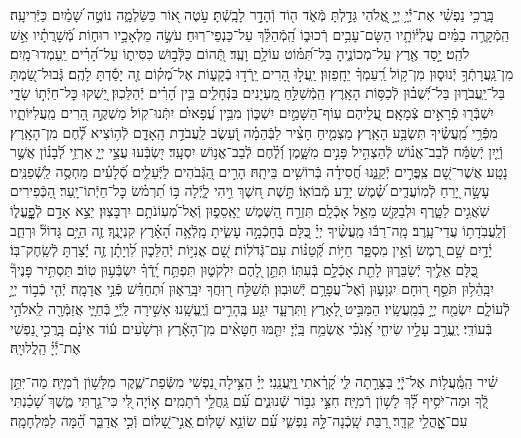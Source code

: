 \documentclass[twoside, openany, parskip=half, 11pt]{book}
\begin{document}
בָּֽרֲכִ֥י נַפְשִׁ֗י אֶת־יְֿ֫יָ֥ יְיָ֣ אֱ֭לֹהַי גָּדַ֣לְתָּ מְּֿאֹ֑ד ה֖וֹד וְֿהָדָ֣ר לָבָֽשְֿׁתָּ׃ עֹ֣טֶה א֭וֹר כַּשַּׂלְמָ֑ה נוֹטֶ֣ה שָׁ֝מַ֗יִם כַּיְּֿרִיעָֽה׃ הַֽמְֿקָרֶ֥ה בַמַּ֗יִם עֲלִיּ֫וֹתָ֥יו הַשָּׂם־עָבִ֥ים רְֿכוּב֑וֹ הַֽ֝מְֿהַלֵּ֗ךְ עַל־כַּנְפֵי־רֽוּחַ׃ עֹשֶׂ֣ה מַלְאָכָ֣יו רוּח֑וֹת מְֿ֝שָׁרֲתָ֗יו אֵ֣שׁ לֹהֵֽט׃ יָ֣סַד אֶ֖רֶץ עַל־מְכוֹנֶ֑יהָ בַּל־תִּ֝מּ֗וֹט עוֹלָ֥ם וָעֶֽד׃ תְּֿ֭הוֹם כַּלְּֿב֣וּשׁ כִּסִּית֑וֹ עַל־הָ֝רִ֗ים יַֽעַמְדוּ־מָֽיִם׃ מִן־גַּֽעֲרָתְֿךָ֥ יְֿנוּס֑וּן מִן־ק֥וֹל רַֽ֝עַמְךָ֗ יֵחָֽפֵזֽוּן׃ יַֽעֲל֣וּ הָ֭רִים יֵֽרְֿד֣וּ בְֿקָע֑וֹת אֶל־מְ֝ק֗וֹם זֶ֤ה יָסַ֬דְתָּ לָהֶֽם׃ גְּֽֿבוּל־שַׂ֭מְתָּ בַּל־יַֽעֲבֹר֑וּן בַּל־יְֿ֝שֻׁב֗וּן לְֿכַסּ֥וֹת הָאָֽרֶץ׃ הַֽמְֿשַׁלֵּ֣חַ מַ֭עְיָנִים בַּנְּֿחָלִ֑ים בֵּ֥ין הָ֝רִ֗ים יְֿהַלֵּכֽוּן׃ יַ֭שְׁקוּ כׇּל־חַיְֿת֣וֹ שָׂדָ֑י יִשְׁבְּֿר֖וּ פְֿרָאִ֣ים צְֿמָאָֽם׃ עֲ֭לֵיהֶם עֽוֹף־הַשָּׁמַ֣יִם יִשְׁכּ֑וֹן מִבֵּ֥ין עֳ֝פָאיִ֗ם יִתְּֿנוּ־קֽוֹל׃ מַשְׁקֶ֣ה הָ֭רִים מֵֽעֲלִיּוֹתָ֑יו מִפְּֿרִ֥י מַֽ֝עֲשֶׂ֗יךָ תִּשְׂבַּ֥ע הָאָֽרֶץ׃ מַצְמִ֤יחַ חָצִ֨יר לַבְּֿהֵמָ֗ה וְֿ֭עֵשֶׂב לַֽעֲבֹדַ֣ת הָֽאָדָ֑ם לְֿה֥וֹצִיא לֶ֝֗חֶם מִן־הָאָֽרֶץ׃ וְֿיַ֤יִן יְֿשַׂמַּ֬ח לְֽֿבַב־אֱנ֗וֹשׁ לְֿהַצְהִ֣יל פָּנִ֣ים מִשָּׁ֑מֶן וְֿ֝לֶ֗חֶם לְֿבַב־אֱנ֥וֹשׁ יִסְעָֽד׃ יִ֭שְׂבְּֿעוּ עֲצֵ֣י יְיָ֑ אַרְזֵ֥י לְֿ֝בָנ֗וֹן אֲשֶׁ֣ר נָטָֽע׃ אֲשֶׁר־שָׁ֭ם צִֽפֳּרִ֣ים יְֿקַנֵּ֑נוּ חֲ֝סִידָ֗ה בְּֿרוֹשִׁ֥ים בֵּיתָֽהּ׃ הָרִ֣ים הַ֭גְּֿבֹהִים לַיְּֿעֵלִ֑ים סְֿ֝לָעִ֗ים מַחְסֶ֥ה לַֽשְֿׁפַנִּֽים׃ עָשָׂ֣ה יָ֭רֵחַ לְֿמֽוֹעֲדִ֑ים שֶׁ֝֗מֶשׁ יָדַ֥ע מְֿבוֹאֽוֹ׃ תָּ֣שֶׁת ח֭שֶׁךְ וִ֣יהִי לָ֑יְֿלָה בּ֥וֹ תִ֝רְמֹ֗שׂ כׇּל־חַיְֿתוֹ־יָֽעַר׃ הַ֭כְּֿפִירִים שֹֽׁאֲגִ֣ים לַטָּ֑רֶף וּלְבַקֵּ֖שׁ מֵאֵ֣ל אָכְֿלָֽם׃ תִּזְרַ֣ח הַ֭שֶּׁמֶשׁ יֵאָֽסֵפ֑וּן וְֿאֶל־מְ֝עֽוֹנֹתָ֥ם יִרְבָּצֽוּן׃ יֵצֵ֣א אָדָ֣ם לְֿפׇׇׇׇׇָֽעֳל֑וֹ וְֿלַֽעֲבֹֽדָת֥וֹ עֲדֵי־עָֽרֶב׃ מָֽה־רַבּ֬וּ מַֽעֲשֶׂ֨יךָ יְיָ֗ כֻּ֭לָּם בְּֿחָכְֿמָ֣ה עָשִׂ֑יתָ מָֽלְֿאָ֥ה הָ֝אָ֗רֶץ קִנְיָנֶֽךָ׃ זֶ֤ה הַיָּ֥ם גָּדוֹל֘ וּרְחַ֢ב יָ֫דָ֥יִם שָׁ֣ם רֶ֭מֶשׂ וְֿאֵ֣ין מִסְפָּ֑ר חַיּ֥וֹת קְֿ֝טַנּ֗וֹת עִם־גְּֿדֹלֽוֹת׃ שָׁ֭ם אֳנִיּ֣וֹת יְֿהַלֵּכ֑וּן לִ֝וְיָתָ֗ן זֶ֤ה יָ֬צַרְתָּ לְֿשַֽׂחֶק־בּֽוֹ׃ כֻּ֭לָּם אֵלֶ֣יךָ יְֿשַׂבֵּר֑וּן לָתֵ֖ת אָכְֿלָ֣ם בְּֿעִתּֽוֹ׃ תִּתֵּ֣ן לָ֭הֶם יִלְקֹט֑וּן תִּפְתַּ֥ח יָֽ֝דְֿךָ֗ יִשְׂבְּֿע֥וּן טֽוֹב׃ תַּסְתִּ֥יר פָּנֶיךָ֘ יִבָּֽהֵ֫ל֥וּן תֹּסֵ֣ף ר֭וּחָם יִגְוָע֑וּן וְֽֿאֶל־עֲפָרָ֥ם יְֿשׁוּבֽוּן׃ תְּֿשַׁלַּ֣ח ר֭וּֽחֲךָ יִבָּֽרֵא֑וּן וּ֝תְחַדֵּ֗שׁ פְּֿנֵ֣י אֲדָמָֽה׃ יְֿהִ֤י כְֿב֣וֹד יְיָ֣ לְֿעוֹלָ֑ם יִשְׂמַ֖ח יְיָ֣ בְּֿמַֽעֲשָֽׂיו׃ הַמַּבִּ֣יט לָ֭אָרֶץ וַתִּרְעָ֑ד יִגַּ֖ע בֶּֽהָרִ֣ים וְֿיֶֽעֱשָֽׁנוּ׃ אָשִׁ֣ירָה לַּֽיְֿיָ֣ בְּֿחַיָּ֑י אֲזַמְּֿרָ֖ה לֵֽאלֹהַ֣י בְּֿעוֹדִֽי׃ יֶֽעֱרַ֣ב עָלָ֣יו שִׂיחִ֑י אָֽ֝נֹכִ֗י אֶשְׂמַ֥ח בַּֽיְֿיָ׃ יִתַּ֤מּוּ חַטָּאִ֨ים מִן־הָאָ֡רֶץ וּרְשָׁ֙עִים ע֬וֹד אֵינָ֗ם בָּֽרֲכִ֣י נַ֭פְשִׁי אֶת־יְֿ֜יָ֗ הַֽלֲלוּיָֽהּ׃

שִׁ֗יר הַֽמַּֽ֫עֲל֥וֹת אֶל־יְֿ֖יָ בַּצָּרָ֣תָה לִּ֑י קָ֝רָ֗אתִי ֽוַיַּֽעֲנֵֽנִי׃ יְיָ֗ הַצִּ֣ילָה נַ֭פְשִׁי מִשְּֿׂפַת־שֶׁ֑קֶר מִלָּשׁ֥וֹן רְֿמִיָּֽה׃ מַה־יִּתֵּ֣ן לְֿ֭ךָ וּמַה־יֹּסִ֥יף לָ֝֗ךְ לָשׁ֥וֹן רְֿמִיָּֽה׃ חִצֵּ֣י גִבּ֣וֹר שְֿׁנוּנִ֑ים עִ֝֗ם גַּֽחֲלֵ֥י רְֿתָמִֽים׃ א֣וֹיָה ֖לִּי כִּי־גַ֣רְתִּי מֶ֑שֶׁךְ שָׁ֝כַ֗נְתִּי עִם־אׇׇׇׇׇׇָֽהֳלֵ֥י קֵדָֽר׃ רַ֭בַּת שָֽׁכְֿנָה־לָּ֣הּ נַפְשִׁ֑י עִ֝֗ם שׂוֹנֵ֥א שָׁלֽוֹם׃ ֽאֲנִ֣י־שָׁ֭לוֹם וְֿכִ֣י אֲדַבֵּ֑ר הֵ֝֗מָּה לַמִּלְחָמָֽה׃
\end{document}
